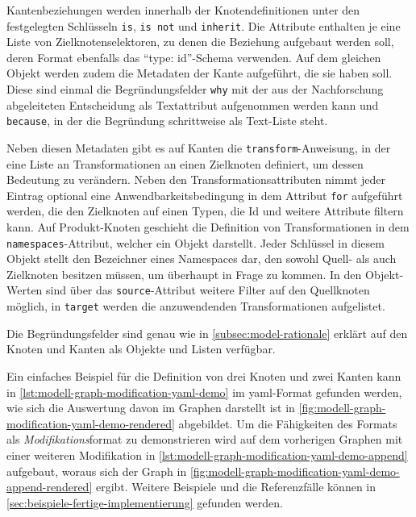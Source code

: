Kantenbeziehungen werden innerhalb der Knotendefinitionen unter den festgelegten Schlüsseln \texttt{is}, \texttt{is not} und \texttt{inherit}.
Die Attribute enthalten je eine Liste von Zielknotenselektoren, zu denen die Beziehung aufgebaut werden soll, deren Format ebenfalls das \enquote{type: id}-Schema verwenden.
Auf dem gleichen Objekt werden zudem die Metadaten der Kante aufgeführt, die sie haben soll.
Diese sind einmal die Begründungsfelder \texttt{why} mit der aus der Nachforschung abgeleiteten Entscheidung als Textattribut aufgenommen werden kann und \texttt{because}, in der die Begründung schrittweise als Text-Liste steht.

Neben diesen Metadaten gibt es auf Kanten die \texttt{transform}-Anweisung, in der eine Liste an Transformationen an einen Zielknoten definiert, um dessen Bedeutung zu verändern.
Neben den Transformationsattributen nimmt jeder Eintrag optional eine Anwendbarkeitsbedingung in dem Attribut \texttt{for} aufgeführt werden, die den Zielknoten auf einen Typen, die Id und weitere Attribute filtern kann.
Auf Produkt-Knoten geschieht die Definition von Transformationen in dem \texttt{namespaces}-Attribut, welcher ein Objekt darstellt.
Jeder Schlüssel in diesem Objekt stellt den Bezeichner eines Namespaces dar, den sowohl Quell- als auch Zielknoten besitzen müssen, um überhaupt in Frage zu kommen.
In den Objekt-Werten sind über das \texttt{source}-Attribut weitere Filter auf den Quellknoten möglich, in \texttt{target} werden die anzuwendenden Transformationen aufgelistet.

Die Begründungsfelder sind genau wie in \autoref{subsec:model-rationale} erklärt auf den Knoten und Kanten als Objekte und Listen verfügbar.

Ein einfaches Beispiel für die Definition von drei Knoten und zwei Kanten kann in \autoref{lst:modell-graph-modification-yaml-demo} im \acrshort{yaml}-Format gefunden werden, wie sich die Auswertung davon im Graphen darstellt ist in \autoref{fig:modell-graph-modification-yaml-demo-rendered} abgebildet.
Um die Fähigkeiten des Formats als \textit{Modifikations}format zu demonstrieren wird auf dem vorherigen Graphen mit einer weiteren Modifikation in \autoref{lst:modell-graph-modification-yaml-demo-append} aufgebaut, woraus sich der Graph in \autoref{fig:modell-graph-modification-yaml-demo-append-rendered} ergibt.
Weitere Beispiele und die Referenzfälle können in \autoref{sec:beispiele-fertige-implementierung} gefunden werden.

